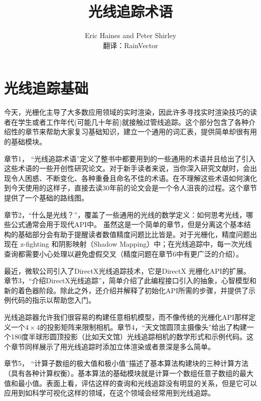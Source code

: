 \documentclass[12pt]{article}
\begin{document}
 
 
 
\title{光线追踪术语}%
\author{Eric Haines and Peter Shirley \\
	翻译：RainVector} 
 
\maketitle
\tableofcontents
 \section{光线追踪基础}
今天，光栅化主导了大多数应用领域的实时渲染，因此许多寻找实时渲染技巧的读者在学生或者工作年代(可能几十年前)就接触过管线追踪。这个部分包含了各种介绍性的章节来帮助大家复习基础知识，建立一个通用的词汇表，提供简单却很有用的基础模块。

章节\color{blue}1\color{black}， “光线追踪术语”定义了整书中都要用到的一些通用的术语并且给出了引入这些术语的一些开创性研究论文。对于新手读者来说，当你深入研究文献时，会出现令人困惑、不断变化、各种重叠且命名不佳的术语。在不理解这些术语如何演化到今天使用的这样子，直接去读30年前的论文会是一个令人沮丧的过程。这个章节提供了一个基础的路线图。

章节\color{blue}2\color{black}，“什么是光线？”，覆盖了一些通用的光线的数学定义：如何思考光线，哪些公式通常会用于现代API中。 虽然这是一个简单的章节，但是分离这个基本结构的基础部分会有助于提醒读者数值精度问题比比皆是。对于光栅化，精度问题出现在 z-fighting 和阴影映射（Shadow Mapping）中；在光线追踪中，每一次光线查询都需要小心处理以避免虚假交叉（精度问题在章节6中有更广泛的介绍）。

最近，微软公司引入了DirectX光线追踪技术，它是DirectX 光栅化API的扩展。章节\color{blue}3\color{black}，“介绍DirectX光线追踪”，简单介绍了此编程接口引入的抽象，心智模型和新的着色器阶段。除此之外，还介绍并解释了初始化API所需的步骤，并提供了示例代码的指示以帮助您入门。

光线追踪器允许我们很容易的构建任意相机模型，而不像传统的光栅化API那样定义一个$4\times 4$的投影矩阵来限制相机。章节\color{blue}4\color{black}，“天文馆圆顶主摄像头”给出了构建一个180度半球形圆顶投影（比如天文馆）光线追踪相机的数学形式和示例代码。这个章节同样展示了用光线追踪时添加立体渲染或者景深是多么简单。

章节\color{blue}5\color{black}， “计算子数组的极大值和极小值”描述了基本算法构建块的三种计算方法（具有各种计算权衡）。基本算法的基础模块就是计算一个数组任意子数组的最大值和最小值。表面上看，评估这样的查询和光线追踪没有明显的关系，但是它可以应用到如科学可视化这样的领域，在这个领域会经常用到光线追踪。
\end{document}

